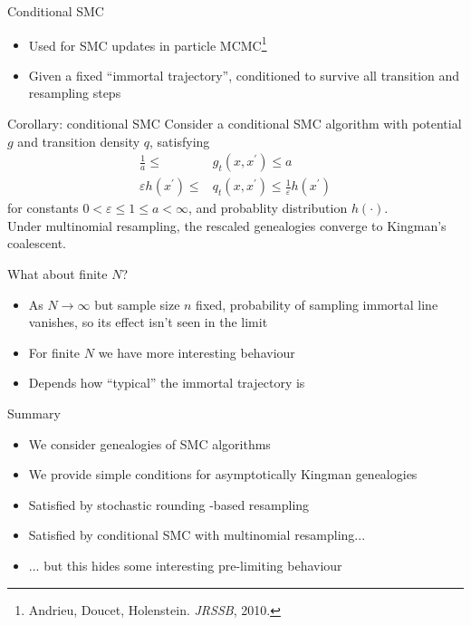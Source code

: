 \documentclass[aspectratio=169]{beamer}
\theoremstyle{definition}
\begin{document}
\begin{frame}{Conditional SMC}
\begin{itemize}
\item Used for SMC updates in particle MCMC\footnote{Andrieu, Doucet, Holenstein. \textit{JRSSB}, 2010.}
\item Given a fixed ``immortal trajectory'', conditioned to survive all transition and resampling steps
\end{itemize}
\end{frame}

\begin{frame}{Corollary: conditional SMC}
Consider a conditional SMC algorithm with potential $g$ and transition density $q$, satisfying
\begin{align*}
\frac{1}{a} \leq &g_t(x, x^\prime) \leq a \\
\varepsilon h(x^\prime) \leq &q_t(x, x^\prime) \leq \frac{1}{\varepsilon} h(x^\prime) 
\end{align*}
for constants $0<\varepsilon\leq 1\leq a<\infty$, and probablity distribution $h(\cdot)$.\\[10pt]

Under multinomial resampling, the rescaled genealogies converge to Kingman's coalescent.
\end{frame}

\begin{frame}{What about finite $N$?}
\begin{itemize}
\item As $N\to\infty$ but sample size $n$ fixed, probability of sampling immortal line vanishes, so its effect isn't seen in the limit
\pause
\item For finite $N$ we have more interesting behaviour
\item Depends how ``typical'' the immortal trajectory is 
\end{itemize}
\end{frame}

\begin{frame}{Summary}
\begin{itemize}
\item We consider genealogies of SMC algorithms
\item We provide simple conditions for asymptotically Kingman genealogies
\item Satisfied by stochastic rounding -based resampling
\item Satisfied by conditional SMC with multinomial resampling...
\item ... but this hides some interesting pre-limiting behaviour
\end{itemize}
\end{frame}
\end{document}
